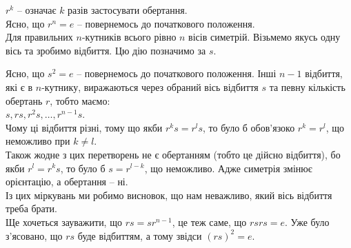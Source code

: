 \documentclass[a4paper, 10pt]{article}
\theoremstyle{theoremdd}
\theoremstyle{theoremdd}
\theoremstyle{theoremdd}
\theoremstyle{theoremdd}
\theoremstyle{theoremdd}
\theoremstyle{theoremdd}
\theoremstyle{theoremdd}
\theoremstyle{theoremdd}
\theoremstyle{theoremdd}
\theoremstyle{theoremdd}
\theoremstyle{theoremdd}
\theoremstyle{theoremdd}
\theoremstyle{theoremdd}
\theoremstyle{theoremdd}
\theoremstyle{theoremdd}
\begin{document}
$r^k$ -- означає $k$ разів застосувати обертання.\\
Ясно, що $r^n = e$ -- повернемось до початкового положення.
\bigskip \\
Для правильних $n$-кутників всього рівно $n$ вісів симетрій. Візьмемо якусь одну вісь та зробимо відбиття. Цю дію позначимо за $s$.
\begin{figure}[H]
\centering
{}
\qquad
{}
\end{figure}
Ясно, що $s^2 = e$ -- повернемось до початкового положення.
Інші $n-1$ відбиття, які є в $n$-кутнику, виражаються через обраний вісь відбиття $s$ та певну кількість обертань $r$, тобто маємо:\\
$s,rs,r^2s,\dots, r^{n-1}s$.\\
Чому ці відбиття різні, тому що якби $r^k s = r^l s$, то було б обов'язоко $r^k = r^l$, що неможливо при $k \neq l$.\\
Також жодне з цих перетворень не є обертанням (тобто це дійсно відбиття), бо якби $r^l = r^ks$, то було б $s = r^{l-k}$, що неможливо. Адже симетрія змінює орієнтацію, а обертання -- ні.\\
Із цих міркувань ми робимо висновок, що нам неважливо, який вісь відбиття треба брати.\\
Ще хочеться зауважити, що $rs = sr^{n-1}$, це теж саме, що $rs rs = e$. Уже було з'ясовано, що $rs$ буде відбиттям, а тому звідси $(rs)^2 = e$.\\
\iffalse Зауважимо також, що $rs = sr^{n-1}$.\\
А за МІ можна довести, що $r^m s = s r^{n-m}$.\fi
\end{document}
